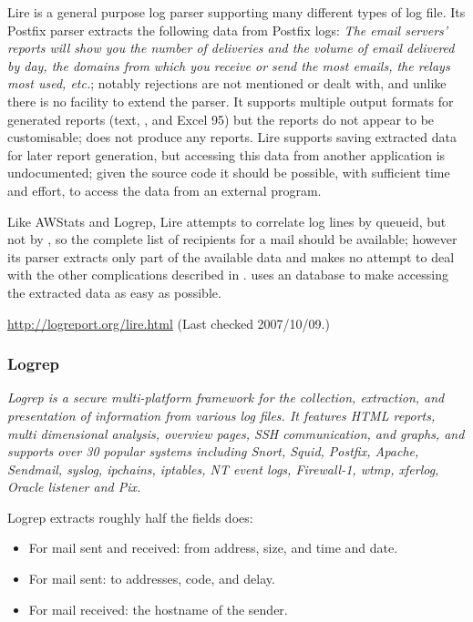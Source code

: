 Lire is a general purpose log parser supporting many different types of log
file.  Its Postfix parser extracts the following data from Postfix logs:
\textit{The email servers' reports will show you the number of deliveries
and the volume of email delivered by day, the domains from which you
receive or send the most emails, the relays most used, etc.\/}; notably
rejections are not mentioned or dealt with, and unlike \parsername{} there
is no facility to extend the parser.  It supports multiple output formats
for generated reports (text, \HTML{}, \PDF{} and Excel 95) but the reports
do not appear to be customisable; \parsername{} does not produce any
reports.  Lire supports saving extracted data for later report generation,
but accessing this data from another application is undocumented; given the
source code it should be possible, with sufficient time and effort, to
access the data from an external program.

Like AWStats and Logrep, Lire attempts to correlate log lines by queueid,
but not by \pid{}, so the complete list of recipients for a mail should be
available; however its parser extracts only part of the available data and
makes no attempt to deal with the other complications described in
 .
\parsername{} uses an \SQL{} database to make accessing the extracted data
as easy as possible.

\url{http://logreport.org/lire.html} \newline (Last checked 2007/10/09.)

\subsubsection{Logrep}

\textit{Logrep is a secure multi-platform framework for the collection,
extraction, and presentation of information from various log files. It
features HTML reports, multi dimensional analysis, overview pages, SSH
communication, and graphs, and supports over 30 popular systems including
Snort, Squid, Postfix, Apache, Sendmail, syslog, ipchains, iptables, NT
event logs, Firewall-1, wtmp, xferlog, Oracle listener and Pix.\/}

Logrep extracts roughly half the fields \parsername{} does:

\begin{itemize}

    \item For mail sent and received: from address, size, and time and
        date.

    \item For mail sent: to addresses, \SMTP{} code, and delay.

    \item For mail received: the hostname of the sender.

\end{itemize}

